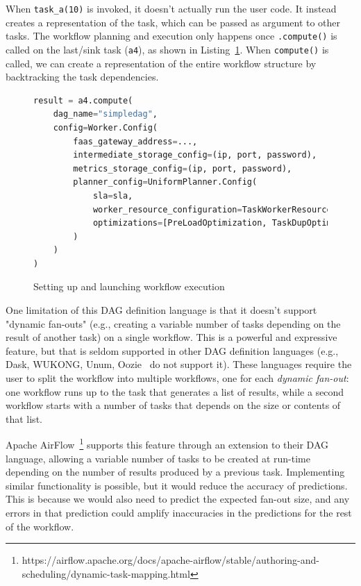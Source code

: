 When \texttt{task\_a(10)} is invoked, it doesn't actually run the user code. It instead creates a representation of the task, which can be passed as argument to other tasks. The workflow planning and execution only happens once \texttt{.compute()} is called on the last/sink task (\texttt{a4}), as shown in Listing~\ref{lst:setup_and_launch_workflow_execution}. When \texttt{compute()} is called, we can create a representation of the entire workflow structure by backtracking the task dependencies.

\begin{figure}[h]
\centering
\begin{lstlisting}[language=Python, basicstyle=\ttfamily\footnotesize, columns=fullflexible, breaklines=true]
result = a4.compute(
    dag_name="simpledag", 
    config=Worker.Config(
        faas_gateway_address=...,
        intermediate_storage_config=(ip, port, password),
        metrics_storage_config=(ip, port, password),
        planner_config=UniformPlanner.Config(
            sla=sla,
            worker_resource_configuration=TaskWorkerResourceConfiguration(cpus=3, memory_mb=512),
            optimizations=[PreLoadOptimization, TaskDupOptimization]
        )
    )
)
\end{lstlisting}
\caption{Setting up and launching workflow execution}
\label{lst:setup_and_launch_workflow_execution}
\end{figure}

One limitation of this DAG definition language is that it doesn't support "dynamic fan-outs" (e.g., creating a variable number of tasks depending on the result of another task) on a single workflow. This is a powerful and expressive feature, but that is seldom supported in other DAG definition languages (e.g., Dask, WUKONG, Unum, Oozie~\cite{apache_oozie} do not support it). These languages require the user to split the workflow into multiple workflows, one for each \textit{dynamic fan-out}: one workflow runs up to the task that generates a list of results, while a second workflow starts with a number of tasks that depends on the size or contents of that list. 

Apache AirFlow~\footnote{https://airflow.apache.org/docs/apache-airflow/stable/authoring-and-scheduling/dynamic-task-mapping.html} supports this feature through an extension to their DAG language, allowing a variable number of tasks to be created at run-time depending on the number of results produced by a previous task. Implementing similar functionality is possible, but it would reduce the accuracy of predictions. This is because we would also need to predict the expected fan-out size, and any errors in that prediction could amplify inaccuracies in the predictions for the rest of the workflow.

